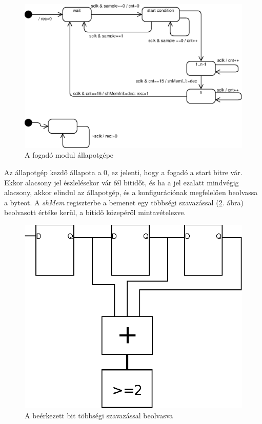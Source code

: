 \begin{figure}[h]
\vspace{0.5cm}
\begin{center}
\includegraphics{figures/rx_state.eps}
\caption{A fogadó modul állapotgépe}
\label{fig:rx_state}
\end{center}
\vspace{0.5cm}
\end{figure}

Az állapotgép kezdő állapota a 0, ez jelenti, hogy a fogadó a start bitre vár. Ekkor alacsony jel észlelésekor vár fél bitidőt, és ha a jel ezalatt mindvégig alacsony, akkor elindul az állapotgép, és a konfigurációnak megfelelően beolvassa a byteot. A \textit{shMem} regiszterbe a bemenet egy többségi szavazással (\ref{fig:voter}. ábra) beolvasott értéke kerül, a bitidő közepéről mintavételezve.

\begin{figure}[h]
\vspace{0.5cm}
\begin{center}
\includegraphics{figures/voter.eps}
\caption{A beérkezett bit többségi szavazással beolvasva}
\label{fig:voter}
\end{center}
\vspace{0.5cm}
\end{figure}

